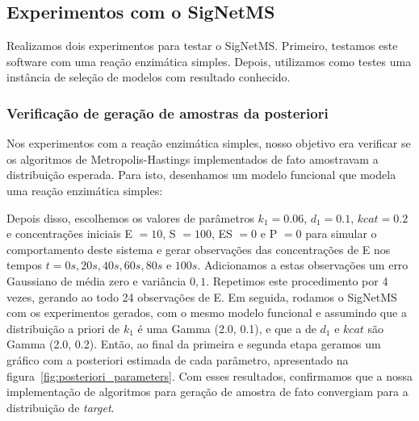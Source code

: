 \documentclass[12pt]{article}
\begin{document}
\subsection{Experimentos com o SigNetMS}\label{experimentos}
Realizamos dois experimentos para testar o SigNetMS. Primeiro, testamos
este software com uma reação enzimática simples. Depois, utilizamos como
testes uma instância de seleção de modelos com resultado conhecido.

\subsubsection{Verificação de geração de amostras da posteriori}
Nos experimentos com a reação enzimática simples, nosso objetivo era
verificar se os algoritmos de Metropolis-Hastings implementados de fato
amostravam a distribuição esperada. Para isto, desenhamos um modelo 
funcional que modela uma reação enzimática simples:
\begin{center}
\end{center}
Depois disso, escolhemos os valores de parâmetros $k_1 = 0.06$, 
$d_1 = 0.1$, $kcat = 0.2$ e concentrações iniciais E $= 10$, S $= 100$, 
ES $= 0$ e P $= 0$ para simular o comportamento deste sistema e gerar 
observações das concentrações de E nos tempos $t = 0s, 20s, 40s, 60s, 
80s$ e $100s$. Adicionamos a estas observações um erro Gaussiano de 
média zero e variância $0,1$. Repetimos este procedimento por 4 vezes, 
gerando ao todo 24 observações de E. Em seguida, rodamos o SigNetMS
com os experimentos gerados, com o mesmo modelo funcional e assumindo
que a distribuição a priori de $k_1$ é uma Gamma (2.0, 0.1), e que a de 
$d_1$ e $kcat$ são Gamma (2.0, 0.2). Então, ao final da primeira e 
segunda etapa geramos um gráfico com a posteriori estimada de cada 
parâmetro, apresentado na figura~\ref{fig:posteriori_parameters}. Com 
esses resultados, confirmamos que a nossa implementação de algoritmos 
para geração de amostra de fato convergiam para a distribuição de {\em 
target}.
\end{document}
